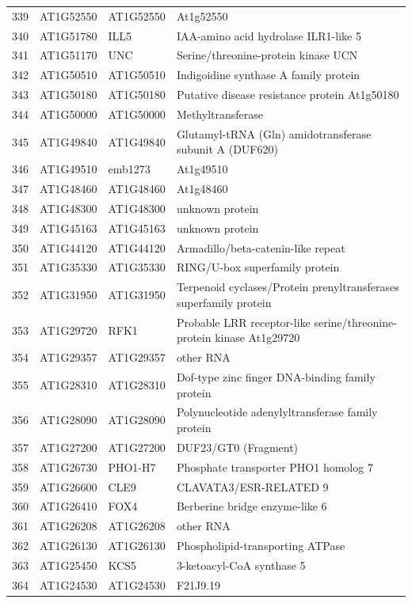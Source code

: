 \documentclass[11pt]{article}
\begin{document}
\begin{center}
\begin{tabular}{rlll}
339 & AT1G52550 & AT1G52550 & At1g52550\\
340 & AT1G51780 & ILL5 & IAA-amino acid hydrolase ILR1-like 5\\
341 & AT1G51170 & UNC & Serine/threonine-protein kinase UCN\\
342 & AT1G50510 & AT1G50510 & Indigoidine synthase A family protein\\
343 & AT1G50180 & AT1G50180 & Putative disease resistance protein At1g50180\\
344 & AT1G50000 & AT1G50000 & Methyltransferase\\
345 & AT1G49840 & AT1G49840 & Glutamyl-tRNA (Gln) amidotransferase subunit A (DUF620)\\
346 & AT1G49510 & emb1273 & At1g49510\\
347 & AT1G48460 & AT1G48460 & At1g48460\\
348 & AT1G48300 & AT1G48300 & unknown protein\\
349 & AT1G45163 & AT1G45163 & unknown protein\\
350 & AT1G44120 & AT1G44120 & Armadillo/beta-catenin-like repeat\\
351 & AT1G35330 & AT1G35330 & RING/U-box superfamily protein\\
352 & AT1G31950 & AT1G31950 & Terpenoid cyclases/Protein prenyltransferases superfamily protein\\
353 & AT1G29720 & RFK1 & Probable LRR receptor-like serine/threonine-protein kinase At1g29720\\
354 & AT1G29357 & AT1G29357 & other RNA\\
355 & AT1G28310 & AT1G28310 & Dof-type zinc finger DNA-binding family protein\\
356 & AT1G28090 & AT1G28090 & Polynucleotide adenylyltransferase family protein\\
357 & AT1G27200 & AT1G27200 & DUF23/GT0 (Fragment)\\
358 & AT1G26730 & PHO1-H7 & Phosphate transporter PHO1 homolog 7\\
359 & AT1G26600 & CLE9 & CLAVATA3/ESR-RELATED 9\\
360 & AT1G26410 & FOX4 & Berberine bridge enzyme-like 6\\
361 & AT1G26208 & AT1G26208 & other RNA\\
362 & AT1G26130 & AT1G26130 & Phospholipid-transporting ATPase\\
363 & AT1G25450 & KCS5 & 3-ketoacyl-CoA synthase 5\\
364 & AT1G24530 & AT1G24530 & F21J9.19\\

\end{tabular}
\end{center}
\end{document}
